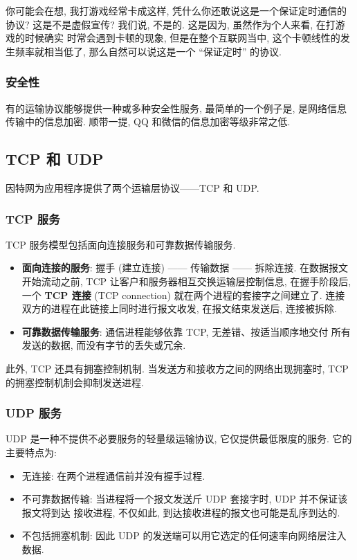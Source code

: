 \documentclass[10pt,UTF8]{book} %
\begin{document}
你可能会在想, 我打游戏经常卡成这样, 凭什么你还敢说这是一个保证定时通信的协议?
这是不是虚假宣传? 我们说, 不是的. 这是因为, 虽然作为个人来看, 在打游戏的时候确实
时常会遇到卡顿的现象, 但是在整个互联网当中, 这个卡顿线性的发生频率就相当低了,
那么自然可以说这是一个 “保证定时” 的协议.

\subsubsection{安全性}

有的运输协议能够提供一种或多种安全性服务, 最简单的一个例子是, 是网络信息传输中的信息加密.
顺带一提, QQ 和微信的信息加密等级非常之低.

\subsection{TCP 和 UDP}

因特网为应用程序提供了两个运输层协议——TCP 和 UDP.

\subsubsection{TCP 服务}

TCP 服务模型包括面向连接服务和可靠数据传输服务.
\begin{itemize}[itemsep=0pt]
    \item \textbf{面向连接的服务}: 握手 (建立连接) —— 传输数据 —— 拆除连接.
    在数据报文开始流动之前, TCP 让客户和服务器相互交换运输层控制信息, 在握手阶段后,
    一个 \textbf{TCP 连接} (TCP connection) 就在两个进程的套接字之间建立了.
    连接双方的进程在此链接上同时进行报文收发, 在报文结束发送后, 连接被拆除.
    \item \textbf{可靠数据传输服务}: 通信进程能够依靠 TCP, 无差错、按适当顺序地交付
    所有发送的数据, 而没有字节的丢失或冗余.
\end{itemize}

此外, TCP 还具有拥塞控制机制. 当发送方和接收方之间的网络出现拥塞时,
TCP 的拥塞控制机制会抑制发送进程.

\subsubsection{UDP 服务}

UDP 是一种不提供不必要服务的轻量级运输协议, 它仅提供最低限度的服务. 它的主要特点为:
\begin{itemize}[itemsep=0pt]
    \item 无连接: 在两个进程通信前并没有握手过程.
    \item 不可靠数据传输: 当进程将一个报文发送斤 UDP 套接字时, UDP 并不保证该报文将到达
    接收进程, 不仅如此, 到达接收进程的报文也可能是乱序到达的.
    \item 不包括拥塞机制: 因此 UDP 的发送端可以用它选定的任何速率向网络层注入数据.
\end{itemize}
\end{document}
